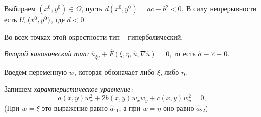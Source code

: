 \documentclass[../main.tex]{subfiles}
\begin{document}

Выбираем $(x^0, y^0) \in \Omega$, пусть $d(x^0, y^0) = ac - b^2 < 0$. В силу непрерывности есть $U_\varepsilon(x^0, y^0)$, где $d < 0$.

Во всех точках этой окрестности тип -- гиперболический.

\begin{definition}
\textit{Второй канонический тип:} $\hat{u}_{\xi\eta} + \hat{F}(\xi, \eta, \hat{u}, \nabla \hat{u}) = 0$, то есть $\hat{a} \equiv \hat{c} \equiv 0$.
\end{definition}
Введём переменную $w$, которая обозначает либо $\xi$, либо $\eta$.

Запишем \textit{характеристическое уравнение:}
\begin{equation*}
	a(x, y) w^{2}_x + 2b(x, y)w_x w_y + c(x, y)w_y^2  = 0, 
\end{equation*}
(При $w = \xi$ это выражение равно $\hat a_{11}$, а при $w = \eta$ оно равно $\hat a_{22}$)
\end{document}
